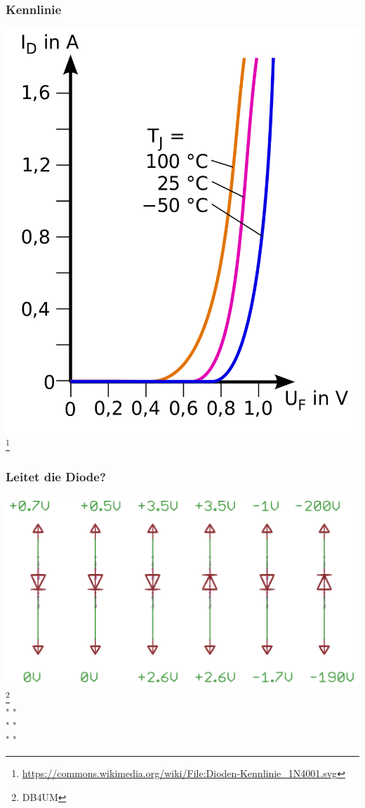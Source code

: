 \begin{frame}
    \frametitle{Kennlinie}
    \begin{center}
        \includegraphics[height=.8\textheight]{e12/Kennlinie_1N4001.png}
        \footnote{\tiny \url{https://commons.wikimedia.org/wiki/File:Dioden-Kennlinie_1N4001.svg}}
	\end{center}
\end{frame}

\begin{frame}
    \frametitle{Leitet die Diode?}
    \begin{center}
        \includegraphics[width=1\textwidth]{e12/Leit_Diode.png}         \footnote{\tiny DB4UM} \\ " "\\ " " \\ " "
	\end{center}
\end{frame}



